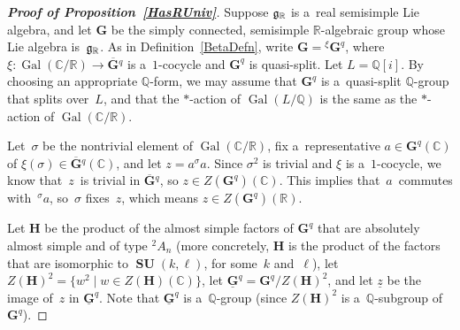 \documentclass[11pt]{article}
\DeclareMathOperator{\Gal}{Gal}
\DeclareMathOperator{\SU}{\mathbf{SU}}
\numberwithin{equation}{section}
\newcommand{\Lie}[1]{\mathfrak{\lowercase{#1}}}
\begin{document}
\begin{proof}[\bf Proof of Proposition~\ref{HasRUniv}] Suppose $\Lie G_\mathbb{R}$ is a~real semisimple Lie algebra, and let $\mathbf{G}$ be the
simply connected, semisimple $\mathbb{R}$-algebraic group whose Lie algebra is~$\Lie G_\mathbb{R}$.
As in Def\/inition~\ref{BetaDefn}, write $\mathbf{G} = {}^\xi \mathbf{G}^q$, where $\xi \colon \Gal(\mathbb{C}/\mathbb{R}) \to
\overline{\mathbf{G}}{}^q$ is a~$1$-cocycle and $\mathbf{G}^q$ is quasi-split.
Let $L = \mathbb{Q}[i]$.
By choosing an appropriate $\mathbb{Q}$-form, we may assume that $\mathbf{G}^q$ is a~quasi-split $\mathbb{Q}$-group that
splits over~$L$, and that the $*$-action of $\Gal(L/\mathbb{Q})$ is the same as the $*$-action of
$\Gal(\mathbb{C}/\mathbb{R})$.

Let~$\sigma$ be the nontrivial element of $\Gal(\mathbb{C}/\mathbb{R})$, f\/ix a~representative $a \in
\mathbf{G}^q(\mathbb{C})$ of $\xi(\sigma) \in \overline{\mathbf{G}}{}^q(\mathbb{C})$, and let $z = a {}^\sigma a$.
Since $\sigma^2$ is trivial and $\xi$ is a~$1$-cocycle, we know that~$z$~is trivial in $\overline{\mathbf{G}}{}^q$, so $z
\in Z(\mathbf{G}^q)(\mathbb{C})$.
This implies that~$a$~commutes with~${}^\sigma a$, so~$\sigma$ f\/ixes~$z$, which means $z \in
Z(\mathbf{G}^q)(\mathbb{R})$.

Let $\mathbf{H}$ be the product of the almost simple factors of $\mathbf{G}^q$ that are absolutely almost simple and of
type ${}^{2} A_n$ (more concretely, $\mathbf{H}$ is the product of the factors that are isomorphic to $\SU(k,\ell)$, for
some~$k$ and~$\ell$), let $Z(\mathbf{H})^2 = \{ w^2 \mid w \in Z(\mathbf{H})(\mathbb{C}) \}$, let
$\underline{\mathbf{G}}^q = \mathbf{G}^q/Z(\mathbf{H})^2$, and let $\underline z$ be the image of~$z$ in
$\underline{\mathbf{G}}^q$.
Note that $\underline{\mathbf{G}}^q$ is a~$\mathbb{Q}$-group (since $Z(\mathbf{H})^2$ is a~$\mathbb{Q}$-subgroup
of~$\mathbf{G}^q$).


\end{proof}
\end{document}
